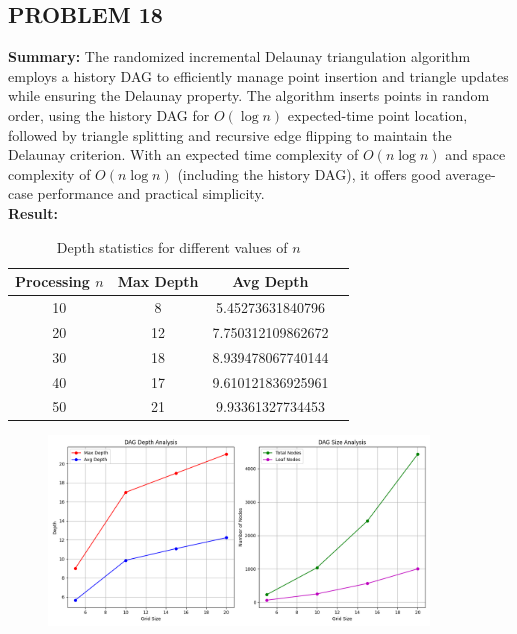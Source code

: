 \documentclass{article}
\begin{document}
\newpage

\subsection*{PROBLEM 18}

\textbf{Summary: }
The randomized incremental Delaunay triangulation algorithm employs a history DAG to efficiently manage point insertion and triangle updates while ensuring the Delaunay property. 
The algorithm inserts points in random order, using the history DAG for \(O(\log n)\) expected-time point location, followed by triangle splitting and recursive edge flipping to maintain the Delaunay criterion. 
With an expected time complexity of \(O(n \log n)\) and space complexity of \(O(n \log n)\) (including the history DAG), it offers good average-case performance and practical simplicity.
\\
\textbf{Result: }
\\
\begin{table}[h!]
    \centering
    \begin{tabular}{@{}cccc@{}}
    \toprule
    \textbf{Processing \( n \)} & \textbf{Max Depth} & \textbf{Avg Depth} \\ \midrule
    10 & 8  & 5.45273631840796 \\
    20 & 12 & 7.750312109862672 \\
    30 & 18 & 8.939478067740144 \\
    40 & 17 & 9.610121836925961 \\
    50 & 21 & 9.93361327734453 \\ \bottomrule
    \end{tabular}
    \caption{Depth statistics for different values of \( n \)}
\end{table}

\begin{figure}[h]
    \centering
    \includegraphics[width=0.9\textwidth]{Figure_1.png}
    \label{fig:model}
\end{figure}
\end{document}
